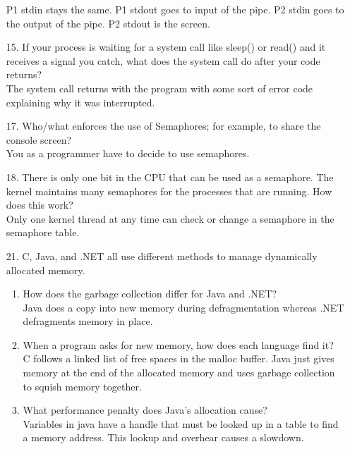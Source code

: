 \documentclass{report}
\begin{document}
\begin{enumerate}
P1 stdin stays the same. P1 stdout goes to input of the pipe. P2 stdin goes to the output of the pipe. P2 stdout is the screen.

\item[15.]If your process is waiting for a system call like sleep() or read() and it receives a signal you catch, what does the system call do after your code returns?\\

The system call returns with the program with some sort of error code explaining why it was interrupted.

\item[17.]Who/what enforces the use of Semaphores; for example, to share the console screen?\\

You as a programmer have to decide to use semaphores.

\item[18.]There is only one bit in the CPU that can be used as a semaphore. The kernel maintains many semaphores for the processes that are running. How does this work?\\

Only one kernel thread at any time can check or change a semaphore in the semaphore table.

\item[21.]C, Java, and .NET all use different methods to manage dynamically allocated memory.
	\begin{enumerate}
	\item How does the garbage collection differ for Java and .NET?\\
	Java does a copy into new memory during defragmentation whereas .NET defragments memory in place.
	
	\item When a program asks for new memory, how does each language find it?\\
	C follows a linked list of free spaces in the malloc buffer. Java just gives memory at the end of the allocated memory and uses garbage collection to squish memory together.

	\item What performance penalty does Java's allocation cause?\\
	Variables in java have a handle that must be looked up in a table to find a memory address. This lookup and overhear causes a slowdown.
	\end{enumerate}
\end{enumerate}
\end{document}
